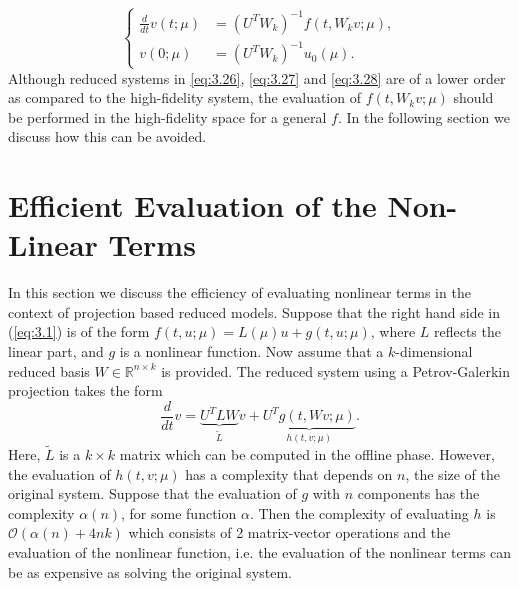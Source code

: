 \begin{equation} \label{eq:3.28}
	\left\{
	\begin{aligned}
	\frac{d}{dt} v(t;\mu) &= (U^T W_k)^{-1} f(t,W_kv;\mu), \\
	v(0;\mu) &= (U^T W_k)^{-1} u_0(\mu).
	\end{aligned}
	\right.
\end{equation} 
Although reduced systems in \eqref{eq:3.26}, \eqref{eq:3.27} and \eqref{eq:3.28} are of a lower order as compared to the high-fidelity system, the evaluation of $f(t,W_kv;\mu)$ should be performed in the high-fidelity space for a general $f$. In the following section we discuss how this can be avoided. 

\section{Efficient Evaluation of the Non-Linear Terms} \label{sec:3.5}
In this section we discuss the efficiency of evaluating nonlinear terms in the context of projection based reduced models. Suppose that the right hand side in (\ref{eq:3.1}) is of the form $f(t, u ; \mu) = L(\mu) u + g(t,u ; \mu)$, where $L$ reflects the linear part, and $g$ is a nonlinear function. Now assume that a $k$-dimensional reduced basis $W \in \mathbb R^{n\times k}$ is provided. The reduced system using a Petrov-Galerkin projection takes the form
\begin{equation} \label{eq:3.29}
	\frac{d}{dt} v= \underbrace{ U^T L W}_{\tilde L} v + \underbrace{ U^T g(t,Wv;\mu)}_{ h (t,v;\mu)}.
\end{equation}
Here, $\tilde L$ is a $k\times k$ matrix which can be computed in the offline phase. However, the evaluation of $ h (t,v;\mu)$ has a complexity that depends on $n$, the size of the original system. Suppose that the evaluation of $g$ with $n$ components has the complexity $\alpha(n)$, for some function $\alpha$. Then the complexity of evaluating $h$ is $\mathcal{O}(\alpha(n) + 4nk)$ which consists of 2 matrix-vector operations and the evaluation of the nonlinear function, i.e. the evaluation of the nonlinear terms can be as expensive as solving the original system.


